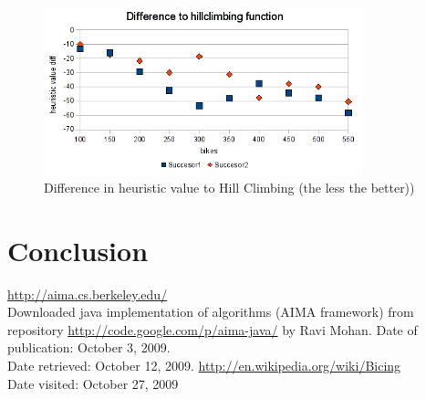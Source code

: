 \documentclass[11pt,twoside,a4paper]{mr}%
\begin{document}
\begin{figure}[ht]
\begin{center}
\includegraphics[width=350px]{images/s1-s2-diff.png}
\caption{Difference in heuristic value to Hill Climbing (the less the better))}
\label{sa:succ-time}
\end{center}
\end{figure}





\chapter{Conclusion}

\clearpage
\begin{thebibliography}{9}
		\url{http://aima.cs.berkeley.edu/} \\
		{Downloaded java implementation of algorithms (AIMA framework) from repository \url{http://code.google.com/p/aima-java/} by Ravi Mohan. Date of publication: October 3, 2009. \\
		Date retrieved: October 12, 2009. }
\url{http://en.wikipedia.org/wiki/Bicing}\\
{Date visited: October 27, 2009}


\end{thebibliography}
\end{document}
